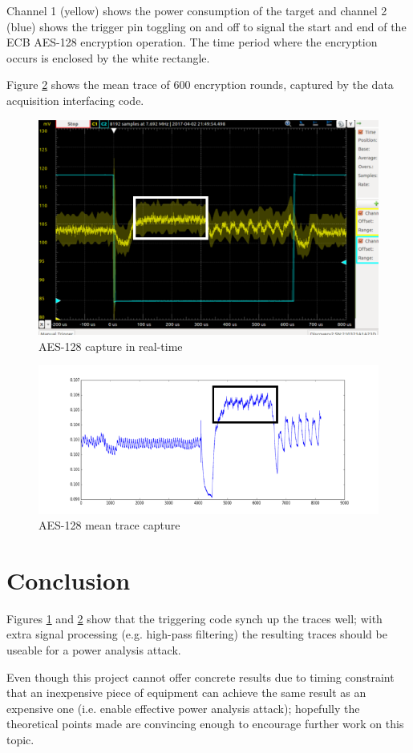 \documentclass[conference]{IEEEtran}
\begin{document}
Channel 1 (yellow) shows the power consumption of the target and channel 2 (blue) shows the trigger pin toggling on and off to signal the start and end of the ECB AES-128 encryption operation. The time period where the encryption occurs is enclosed by the white rectangle.

Figure \ref{fig:aes_avg} shows the mean trace of 600 encryption rounds, captured by the data acquisition interfacing code.

\begin{figure}
  \includegraphics[scale=0.45]{aes_annotate.png}
  \caption{AES-128 capture in real-time}
  \label{fig:aes}
\end{figure}

\begin{figure}
  \includegraphics[scale=0.45]{aes_acquisition_annotate.png}
  \caption{AES-128 mean trace capture}
  \label{fig:aes_avg}
\end{figure}

\section{Conclusion}
Figures \ref{fig:aes} and \ref{fig:aes_avg} show that the triggering code synch up the traces well; with extra signal processing (e.g. high-pass filtering) the resulting traces should be useable for a power analysis attack.

Even though this project cannot offer concrete results due to timing constraint that an inexpensive piece of equipment can achieve the same result as an expensive one (i.e. enable effective power analysis attack); hopefully the theoretical points made are convincing enough to encourage further work on this topic.

%


\end{document}
